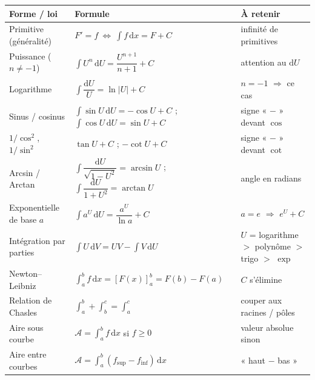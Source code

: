 \documentclass[11pt,a4paper]{article}
\newcommand{\dd}{\mathrm{d}}
\newcommand{\tg}{\tan}
\newcommand{\cotg}{\cot}
\begin{document}
\begin{center}
\renewcommand{\arraystretch}{1.5}
\begin{tabular}{>{\raggedright\arraybackslash}p{4.9cm} >{\centering\arraybackslash}p{5.2cm} >{\raggedright\arraybackslash}p{4.1cm}}
\rowcolor{primary!18}
\textbf{Forme / loi} & \textbf{Formule} & \textbf{À retenir}\\
\midrule
Primitive (généralité) & $F'=f\ \Leftrightarrow\ \int f\,\dd x=F+C$ & infinité de primitives\\
Puissance ($n\neq -1$) & $\int U^n\,\dd U=\dfrac{U^{n+1}}{n+1}+C$ & attention au $\dd U$\\
Logarithme & $\int\dfrac{\dd U}{U}=\ln|U|+C$ & $n=-1$ $\Rightarrow$ ce cas\\
Sinus / cosinus & $\int\sin U\,\dd U=-\cos U+C$ ; $\int\cos U\,\dd U=\sin U+C$ & signe « $-$ » devant $\cos$\\
$1/\cos^2$, $1/\sin^2$ & $\tg U+C$ ; $-\cotg U+C$ & signe « $-$ » devant $\cotg$\\
Arcsin / Arctan & $\int\dfrac{\dd U}{\sqrt{1-U^2}}=\arcsin U$ ; $\int\dfrac{\dd U}{1+U^2}=\arctan U$ & angle en radians\\
Exponentielle de base $a$ & $\int a^U\,\dd U=\dfrac{a^U}{\ln a}+C$ & $a=e$ $\Rightarrow$ $e^U+C$\\
Intégration par parties & $\int U\,\dd V=UV-\int V\,\dd U$ & $U$ = logarithme $>$ polynôme $>$ trigo $>$ $\exp$\\
Newton--Leibniz & $\int_a^b f\,\dd x=[F(x)]_a^b=F(b)-F(a)$ & $C$ s'élimine\\
Relation de Chasles & $\int_a^b+\int_b^c=\int_a^c$ & couper aux racines / pôles\\
Aire sous courbe & $\mathcal{A}=\int_a^b f\,\dd x$ si $f\geqslant 0$ & valeur absolue sinon\\
Aire entre courbes & $\mathcal{A}=\int_a^b(f_{\text{sup}}-f_{\text{inf}})\,\dd x$ & « haut $-$ bas »\\
\bottomrule
\end{tabular}
\end{center}
\end{document}
